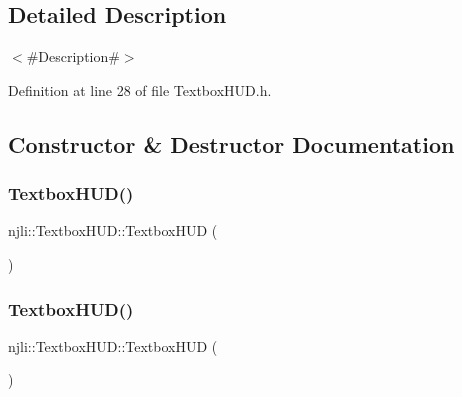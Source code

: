 \subsection{Detailed Description}
$<$\#\+Description\#$>$ 

Definition at line 28 of file Textbox\+H\+U\+D.\+h.



\subsection{Constructor \& Destructor Documentation}
\mbox{\label{classnjli_1_1_textbox_h_u_d_a9a0ce975431d7930d46a0406bf82bffb}} 
\subsubsection{\texorpdfstring{Textbox\+H\+U\+D()}{TextboxHUD()}\hspace{0.1cm}{\footnotesize\ttfamily [1/3]}}
{\footnotesize\ttfamily njli\+::\+Textbox\+H\+U\+D\+::\+Textbox\+H\+UD (\begin{DoxyParamCaption}{ }\end{DoxyParamCaption})\hspace{0.3cm}{\ttfamily [protected]}}

\mbox{\label{classnjli_1_1_textbox_h_u_d_a72ea32640b49facfc173d4bce0154059}} 
\subsubsection{\texorpdfstring{Textbox\+H\+U\+D()}{TextboxHUD()}\hspace{0.1cm}{\footnotesize\ttfamily [2/3]}}
{\footnotesize\ttfamily njli\+::\+Textbox\+H\+U\+D\+::\+Textbox\+H\+UD (\begin{DoxyParamCaption}\item[{const \mbox{\hyperlink{classnjli_1_1_abstract_builder}{Abstract\+Builder}} \&}]{ }\end{DoxyParamCaption})\hspace{0.3cm}{\ttfamily [protected]}}


